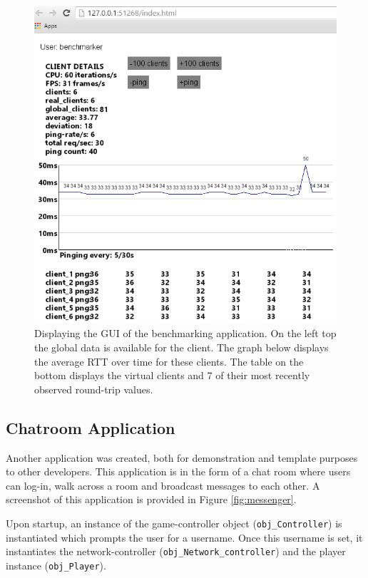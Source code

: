 \documentclass[bsc, 12pt, twoside, singlespacing, parskip, abbrevs, notimes, normalheadings, logo]{styles/infthesis}
\begin{document}
\begin{figure}[H]
\centering
\includegraphics[scale=0.62]{images/benchmarker2.jpg}
\caption{Displaying the GUI of the benchmarking application. On the left top the global data is available for the client. The graph below displays the average RTT over time for these clients. The table on the bottom displays the virtual clients and 7 of their most recently observed round-trip values.}
\label{fig:benchmark_gui}
\end{figure}



\subsection{Chatroom Application}
Another application was created, both for demonstration and template purposes to other developers. This application is in the form of a chat room where users can log-in, walk across a room and broadcast messages to each other. A screenshot of this application is provided in Figure \ref{fig:messenger}.

Upon startup, an instance of the game-controller object (\texttt{obj\_Controller}) is instantiated which prompts the user for a username. Once this username is set, it instantiates the network-controller (\texttt{obj\_Network\_controller}) and the player instance (\texttt{obj\_Player}).
\end{document}
